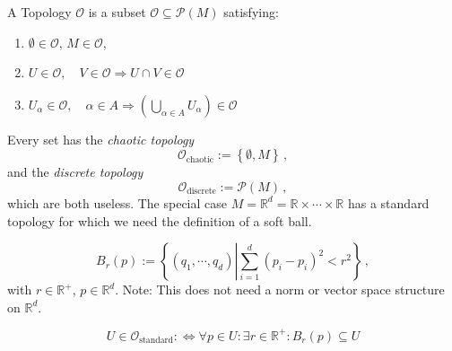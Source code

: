 \documentclass[11pt, a4paper, twocolumn]{article} %
\begin{document}
\begin{defn}[Topology]
    A Topology $\mathcal{O}$ is a subset $\mathcal{O} \subseteq \mathcal{P}(M)$ satisfying:
    \begin{enumerate}
        \item $\emptyset \in \mathcal{O}$, $M\in\mathcal{O}$,
        \item $U\in\mathcal{O},\quad V\in\mathcal{O}\Rightarrow U\cap V\in\mathcal{O}$
        \item $U_\alpha\in\mathcal{O},\quad \alpha\in A \Rightarrow
            \left( \bigcup\limits_{\alpha\in A} U_\alpha \right) \in \mathcal{O}$
    \end{enumerate}
\end{defn}

Every set has the \textit{chaotic topology}
\begin{equation}
    \mathcal{O}_\text{chaotic} := \left\{ \emptyset, M \right\}\,,
\end{equation}
and the \textit{discrete topology}
\begin{equation}
    \mathcal{O}_\text{discrete} := \mathcal{P}(M)\,,
\end{equation}
which are both useless.
The special case $M = \mathbb{R}^d = \mathbb{R} \times \cdots \times \mathbb{R}$ has a standard topology
for which we need the definition of a soft ball.
\begin{defn}
   \begin{equation}
   B_r(p) := \left\{ (q_1,\cdots,q_d) \left| \sum_{i=1}^{d}(p_i-p_i)^2 < r^2\right. \right\}\,,
   \end{equation} 
   with $r\in \mathbb{R}^+$, $p\in\mathbb{R}^d$.
   Note: This does not need a norm or vector space structure on $\mathbb{R}^d$.
\end{defn}
\begin{defn}
    \begin{equation}
        U \in \mathcal{O}_\text{standard} :\Leftrightarrow \forall p\in U:
        \exists r\in\mathbb{R}^+ : B_r(p) \subseteq U
    \end{equation}
\end{defn}
\end{document}
